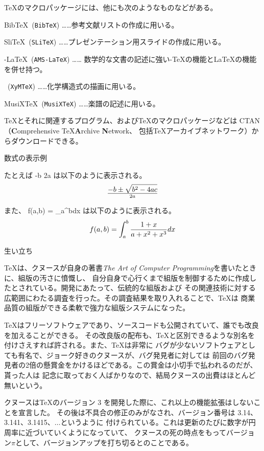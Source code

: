 \TeX のマクロパッケージには、他にも次のようなものなどがある。

\item B{\sc ib}\TeX\ ({\tt BibTeX}) ……参考文献リストの作成に用いる。
\item S{\sc li}\TeX\ ({\tt SLiTeX}) ……プレゼンテーション用スライドの作成に用いる。
\item \AmS-\LaTeX\ ({\tt AMS-LaTeX}) ……
数学的な文書の記述に強い\AmS-\TeX の機能と\LaTeX の機能を併せ持つ。
\item \XyMTeX\ ({\tt XyMTeX}) ……化学構造式の描画に用いる。
\item MusiX\TeX\ ({\tt MusiXTeX}) ……楽譜の記述に用いる。
\enditem

\TeX とそれに関連するプログラム、および\TeX のマクロパッケージなどは CTAN（{\bf C}omprehensive \TeX {\bf A}rchive {\bf N}etwork、
包括\TeX アーカイブネットワーク）からダウンロードできる。


\beginsection 数式の表示例

たとえば
\begintt
-b \pm {} \over 2a
\endtt
は以下のように表示される。
$$
-b \pm \sqrt{b^{2} - 4ac} \over 2a
$$

また、
\begintt
f(a,b) = \int_{a}^{b}dx
\endtt
は以下のように表示される。
$$
f(a,b) = \int_{a}^{b}{1 + x \over a + x^{2} + x^{3}}dx
$$


\beginsection 生い立ち

\TeX は、クヌースが自身の著書{\it The Art of Computer Programming\/}を書いたときに、組版の汚さに憤慨し、
自分自身で心行くまで組版を制御するために作成したとされている。開発にあたって、伝統的な組版および
その関連技術に対する広範囲にわたる調査を行った。その調査結果を取り入れることで、\TeX は
商業品質の組版ができる柔軟で強力な組版システムになった。

\TeX はフリーソフトウェアであり、ソースコードも公開されていて、誰でも改良を加えることができる。
その改良版の配布も、\TeX と区別できるような別名を付けさえすれば許される。また、\TeX は非常に
バグが少ないソフトウェアとしても有名で、ジョーク好きのクヌースが、バグ発見者に対しては
前回のバグ発見者の2倍の懸賞金をかけるほどである。この賞金は小切手で払われるのだが、貰った人は
記念に取っておく人ばかりなので、結局クヌースの出費はほとんど無いという。

クヌースは\TeX のバージョン 3 を開発した際に、これ以上の機能拡張はしないことを宣言した。
その後は不具合の修正のみがなされ、バージョン番号は 3.14、3.141、3.1415、$\ldots$というように
付けられている。これは更新のたびに数字が円周率に近づいていくようになっていて、
クヌースの死の時点をもってバージョン$\pi$として、バージョンアップを打ち切るとのことである。

